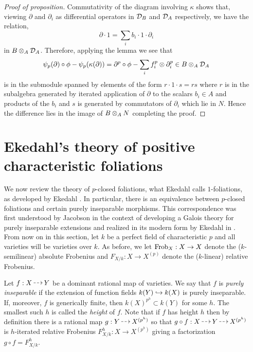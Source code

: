 \documentclass[main.tex]{subfiles}
\begin{document}
\begin{proof}[Proof of proposition]
Commutativity of the diagram involving $\kappa$ shows that, viewing $\partial$ and $\partial_i$ as differential operators in $\mathcal{D}_B$ and $\mathcal{D}_A$ respectively, we have the relation,
\[ \partial \cdot 1 = \sum_i b_i \cdot 1 \cdot \partial_i \]
in $B \otimes_A \mathcal{D}_A$. Therefore, applying the lemma we see that
\[ \psi_p(\partial) \circ \phi - \psi_p(\kappa(\partial)) = \partial^p \circ \phi - \sum_i f_i^p \otimes \partial_i^p \in B \otimes_A \mathcal{D}_A \]
is in the submodule spanned by elements of the form $r \cdot 1 \cdot s = rs$ where $r$ is in the subalgebra generated by iterated application of $\partial$ to the scalars $b_i \in A$ and products of the $b_i$ and $s$ is generated by commutators of $\partial_i$ which lie in $N$. Hence the difference lies in the image of $B \otimes_A N$ completing the proof.
\end{proof}


\section{Ekedahl's theory of positive characteristic foliations} \label{section:Ekedahl}

We now review the theory of $p$-closed foliations, what Ekedahl calls $1$-foliations, as developed by Ekedahl \cite{ekedahl:foliations}. In particular, there is an equivalence between $p$-closed foliations and certain purely inseparable morphisms. This correspondence was first understood by Jacobson in the context of developing a Galois theory for purely inseparable extensions \cite{jacobson:galois_theory_purely_inseparable} and realized in its modern form by Ekedahl in \cite{ekedahl:foliations}. From now on in this section, let $k$ be a perfect field of characteristic $p$ and all varieties will be varieties over $k$. As before, we let $\operatorname{\mathrm{Frob}}_X : X \to X$ denote the ($k$-semilinear) absolute Frobenius and $F_{X/k} : X \to X^{(p)}$ denote the ($k$-linear) relative Frobenius.


\begin{defn}
Let $f : X \rat Y$ be a dominant rational map of varieties. We say that $f$ is \textit{purely inseparable} if the extension of function fields $k(Y) \hookrightarrow k(X)$ is purely inseparable. If, moreover, $f$ is generically finite, then 
$k(X)^{p^h} \subset k(Y)$ for some $h$. The smallest such $h$ is called the \textit{height} of $f$.
Note that if $f$ has height $h$ then by definition there is a rational map $g : Y \rat X^{(p^h)}$ so that $g \circ f : X \rat Y \rat X^{(p^h)}$ is $h$-iterated relative Frobenius $F_{X/k}^h : X \to X^{(p^h)}$ giving a factorization $g \circ f = F_{X/k}^h$.
\end{defn}
\end{document}

